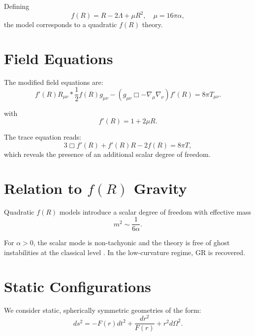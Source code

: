 \documentclass[11pt,a4paper]{article}
\begin{document}
Defining
\begin{equation}
f(R) = R - 2\Lambda + \mu R^2, \quad \mu = 16\pi\alpha,
\end{equation}
the model corresponds to a quadratic $f(R)$ theory.

\section{Field Equations}

The modified field equations are:
\begin{equation}
f'(R) R_{\mu\nu}

* \frac{1}{2} f(R) g_{\mu\nu}

- (g_{\mu\nu}\Box - \nabla_\mu \nabla_\nu) f'(R)
  = 8\pi T_{\mu\nu}.
  \end{equation}

with
\begin{equation}
f'(R) = 1 + 2\mu R.
\end{equation}

The trace equation reads:
\begin{equation}
3\Box f'(R) + f'(R)R - 2f(R) = 8\pi T,
\end{equation}
which reveals the presence of an additional scalar degree of freedom.

\section{Relation to $f(R)$ Gravity}

Quadratic $f(R)$ models introduce a scalar degree of freedom with effective mass
\begin{equation}
m^2 \sim \frac{1}{6\alpha}.
\end{equation}

For $\alpha > 0$, the scalar mode is non-tachyonic and the theory is free of ghost instabilities at the classical level \cite{defelice2010}. In the low-curvature regime, GR is recovered.

\section{Static Configurations}

We consider static, spherically symmetric geometries of the form:
\begin{equation}
ds^2 =
-F(r)dt^2
+
\frac{dr^2}{F(r)}
+
r^2 d\Omega^2.
\end{equation}
\end{document}
